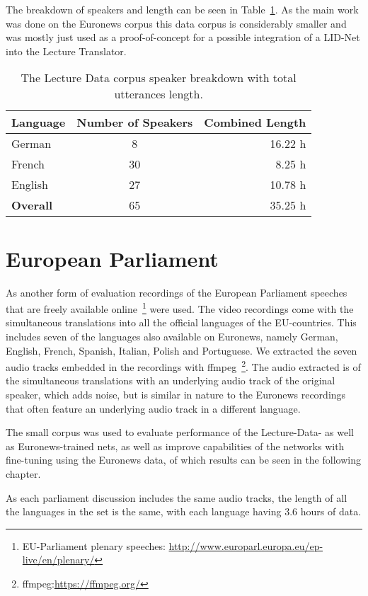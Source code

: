 The breakdown of speakers and length can be seen in Table~\ref{tab:spkDataLD}. As the main work was done on the Euronews corpus this data corpus is considerably smaller and was mostly just used as a proof-of-concept for a possible integration of a LID-Net into the Lecture Translator. 
\begin{table}[h!]
\label{tab:spkDataLD}
\centering
\begin{tabular}{| l | c | r | }
	\hline
	\textbf{Language} & \textbf{Number of Speakers} & \textbf{Combined Length} \\
	\hline
	German & 8 &  16.22 h \\
	French & 30 & 8.25 h \\  
	English & 27 & 10.78 h \\ 
	\hline
	\textbf{Overall} & 65 & 35.25 h\\
	\hline
	
\end{tabular}
\caption{The Lecture Data corpus speaker breakdown with total utterances length.}
\end{table}

\section{European Parliament}
\label{sec:LITasks:EU}

As another form of evaluation recordings of the European Parliament speeches that are freely available online~\footnote{EU-Parliament plenary speeches: \url{http://www.europarl.europa.eu/ep-live/en/plenary/}} were used. The video recordings come with the simultaneous translations into all the official languages of the EU-countries.  This includes seven of the languages also available on Euronews, namely German, English, French, Spanish, Italian, Polish and Portuguese. We extracted the seven audio tracks embedded in the recordings with ffmpeg~\footnote{ffmpeg:\url{https://ffmpeg.org/}}. The audio extracted is of the simultaneous translations with an underlying audio track of the original speaker, which adds noise, but is similar in nature to the Euronews recordings that often feature an underlying audio track in a different language.

The small corpus was used to evaluate performance of the Lecture-Data- as well as Euronews-trained nets, as well as improve capabilities of the networks with fine-tuning using the Euronews data, of which results can be seen in the following chapter.

As each parliament discussion includes the same audio tracks, the length of all the languages in the set is the same, with each language having 3.6 hours of data. 

